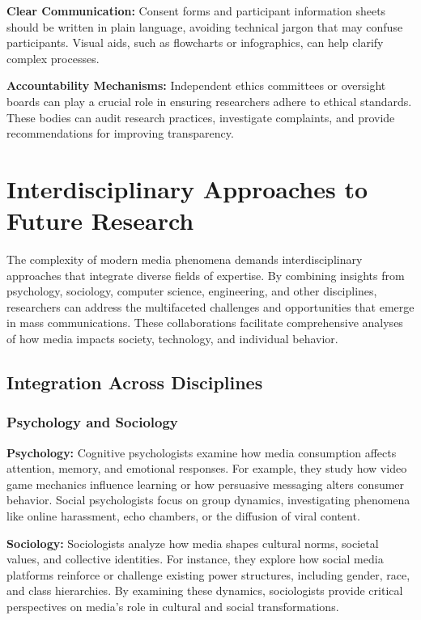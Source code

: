 \documentclass[
]{book}
\begin{document}
\textbf{Clear Communication:} Consent forms and participant information sheets should be written in plain language, avoiding technical jargon that may confuse participants. Visual aids, such as flowcharts or infographics, can help clarify complex processes.

\textbf{Accountability Mechanisms:} Independent ethics committees or oversight boards can play a crucial role in ensuring researchers adhere to ethical standards. These bodies can audit research practices, investigate complaints, and provide recommendations for improving transparency.

\section{Interdisciplinary Approaches to Future Research}\label{interdisciplinary-approaches-to-future-research}

The complexity of modern media phenomena demands interdisciplinary approaches that integrate diverse fields of expertise. By combining insights from psychology, sociology, computer science, engineering, and other disciplines, researchers can address the multifaceted challenges and opportunities that emerge in mass communications. These collaborations facilitate comprehensive analyses of how media impacts society, technology, and individual behavior.

\subsection{Integration Across Disciplines}\label{integration-across-disciplines}

\subsubsection{Psychology and Sociology}\label{psychology-and-sociology}

\textbf{Psychology:} Cognitive psychologists examine how media consumption affects attention, memory, and emotional responses. For example, they study how video game mechanics influence learning or how persuasive messaging alters consumer behavior. Social psychologists focus on group dynamics, investigating phenomena like online harassment, echo chambers, or the diffusion of viral content.

\textbf{Sociology:} Sociologists analyze how media shapes cultural norms, societal values, and collective identities. For instance, they explore how social media platforms reinforce or challenge existing power structures, including gender, race, and class hierarchies. By examining these dynamics, sociologists provide critical perspectives on media's role in cultural and social transformations.
\end{document}
